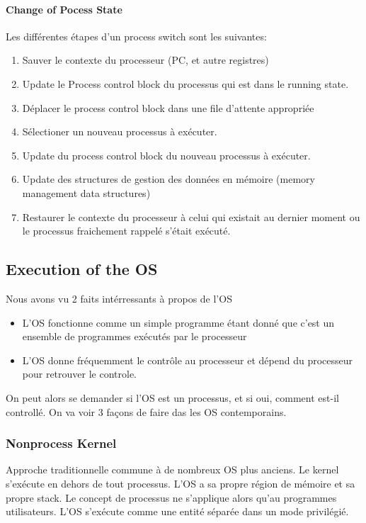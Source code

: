 \paragraph{Change of Pocess State}
Les différentes étapes d'un process switch sont les suivantes:
\begin{enumerate}
  \item Sauver le contexte du processeur (PC, et autre registres)
  \item Update le Process control block du processus qui est dans le running state.
  \item Déplacer le process control block dans une file d'attente appropriée
  \item Sélectioner un nouveau processus à exécuter.
  \item Update du process control block du nouveau processus à exécuter.
  \item Update des structures de gestion des données en mémoire (memory management data structures)
  \item Restaurer le contexte du processeur à celui qui existait au dernier moment ou le processus fraichement rappelé s'était exécuté.
\end{enumerate}

\subsection{Execution of the OS}
Nous avons vu 2 faits intérressants à propos de l'OS
\begin{itemize}
  \item L'OS fonctionne comme un simple programme étant donné que c'est un ensemble de programmes exécutés par le processeur
  \item L'OS donne fréquemment le contrôle au processeur et dépend du processeur pour retrouver le controle.
\end{itemize}
On peut alors se demander si l'OS est un processus, et si oui, comment est-il controllé.
On va voir 3 façons de faire das les OS contemporains.

\subsubsection{Nonprocess Kernel}
Approche traditionnelle commune à de nombreux OS plus anciens.
Le kernel s'exécute en dehors de tout processus.
L'OS a sa propre région de mémoire et sa propre stack.
Le concept de processus ne s'applique alors qu'au programmes utilisateurs.
L'OS s'exécute comme une entité séparée dans un mode privilégié.

